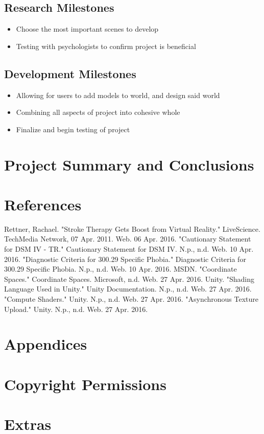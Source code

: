 \documentclass[a4paper,10pt]{article}
\begin{document}
	\subsection{Research Milestones}
		\begin{itemize}
			\item Choose the most important scenes to develop
			\item Testing with psychologists to confirm project is beneficial
		\end{itemize}
	\subsection{Development Milestones}
		\begin{itemize}
			\item Allowing for users to add models to world, and design said world
			\item Combining all aspects of project into cohesive whole
			\item Finalize and begin testing of project
		\end{itemize}

\pagebreak
\section{Project Summary and Conclusions}

\pagebreak
{}
\setcounter{page}{1}
\section{References}


\begin{thebibliography}{9}
Rettner, Rachael. "Stroke Therapy Gets Boost from Virtual Reality." LiveScience. TechMedia Network, 07 Apr. 2011. Web. 06 Apr. 2016.
"Cautionary Statement for DSM IV - TR." Cautionary Statement for DSM IV. N.p., n.d. Web. 10 Apr. 2016.
"Diagnostic Criteria for 300.29 Specific Phobia." Diagnostic Criteria for 300.29 Specific Phobia. N.p., n.d. Web. 10 Apr. 2016.
MSDN. "Coordinate Spaces." Coordinate Spaces. Microsoft, n.d. Web. 27 Apr. 2016.
Unity. "Shading Language Used in Unity." Unity Documentation. N.p., n.d. Web. 27 Apr. 2016.
"Compute Shaders." Unity. N.p., n.d. Web. 27 Apr. 2016.
"Asynchronous Texture Upload." Unity. N.p., n.d. Web. 27 Apr. 2016.
\end{thebibliography}


\section{Appendices}

\section{Copyright Permissions}

\section{Extras}
\end{document}
